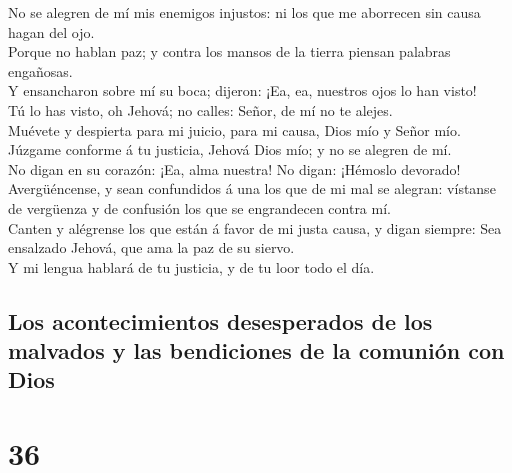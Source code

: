  No se alegren de mí mis enemigos injustos: ni los que me
aborrecen sin causa hagan del ojo.\\
 Porque no hablan paz; y contra los mansos de la tierra
piensan palabras engañosas.\\
 Y ensancharon sobre mí su boca; dijeron: ¡Ea, ea,
nuestros ojos lo han visto!\\
 Tú lo has visto, oh Jehová; no calles: Señor, de mí no
te alejes.\\
 Muévete y despierta para mi juicio, para mi causa, Dios
mío y Señor mío.\\
 Júzgame conforme á tu justicia, Jehová Dios mío; y no se
alegren de mí.\\
 No digan en su corazón: ¡Ea, alma nuestra! No digan:
¡Hémoslo devorado!\\
 Avergüéncense, y sean confundidos á una los que de mi
mal se alegran: vístanse de vergüenza y de confusión los que se
engrandecen contra mí.\\
 Canten y alégrense los que están á favor de mi justa
causa, y digan siempre: Sea ensalzado Jehová, que ama la paz de su
siervo.\\
 Y mi lengua hablará de tu justicia, y de tu loor todo el
día.

\hypertarget{los-acontecimientos-desesperados-de-los-malvados-y-las-bendiciones-de-la-comuniuxf3n-con-dios}{%
\subsection{Los acontecimientos desesperados de los malvados y las
bendiciones de la comunión con
Dios}\label{los-acontecimientos-desesperados-de-los-malvados-y-las-bendiciones-de-la-comuniuxf3n-con-dios}}

\hypertarget{section-35}{%
\section{36}\label{section-35}}

